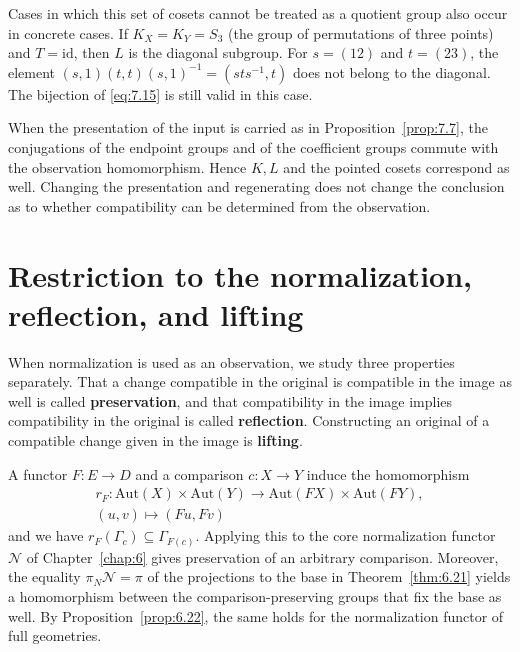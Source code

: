 Cases in which this set of cosets cannot be treated as a quotient group also occur in concrete cases.
If $K_X=K_Y=S_3$ (the group of permutations of three points) and $T=\mathrm{id}$, then $L$
is the diagonal subgroup.
For $s=(12)$ and $t=(23)$, the element
$(s,1)(t,t)(s,1)^{-1}=(sts^{-1},t)$ does not belong to the diagonal.
The bijection of \eqref{eq:7.15} is still valid in this case.

When the presentation of the input is carried as in Proposition~\ref{prop:7.7}, the
conjugations of the endpoint groups and of the coefficient groups commute with the
observation homomorphism.
Hence $K,L$ and the pointed cosets correspond as well.
Changing the presentation and regenerating does not change the conclusion as to whether
compatibility can be determined from the observation.

\section{Restriction to the normalization, reflection, and lifting}\label{sec:7.4}

When normalization is used as an observation, we study three properties separately.
That a change compatible in the original is compatible in the image as well is called
\textbf{preservation}, and that compatibility in the image implies compatibility in the
original is called \textbf{reflection}. Constructing an original of a compatible change
given in the image is \textbf{lifting}.

\begin{proposition}\label{prop:7.12}

A functor $F:E\to D$ and a comparison $c:X\to Y$ induce the homomorphism
\begin{equation*}
\begin{gathered}
r_F:\mathrm{Aut}(X)\times\mathrm{Aut}(Y)
\longrightarrow\mathrm{Aut}(FX)\times\mathrm{Aut}(FY),\\
(u,v)\longmapsto(Fu,Fv)
\end{gathered}
\tag{7.16}\label{eq:7.16}
\end{equation*}
and we have $r_F(\Gamma_c)\subseteq\Gamma_{F(c)}$.
Applying this to the core normalization functor $\mathcal N$ of Chapter~\ref{chap:6} gives
preservation of an arbitrary comparison.
Moreover, the equality $\pi_N\mathcal N=\pi$ of the projections to the base in
Theorem~\ref{thm:6.21} yields a homomorphism between the comparison-preserving groups that
fix the base as well.
By Proposition~\ref{prop:6.22}, the same holds for the normalization functor of full
geometries.

\end{proposition}

